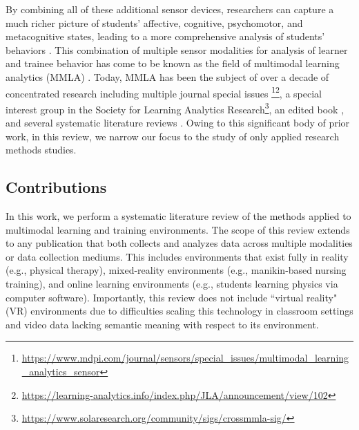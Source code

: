 \documentclass[manuscript,screen,review]{acmart}
\begin{document}
By combining all of these additional sensor devices, researchers can capture a much richer picture of students' affective, cognitive, psychomotor, and metacognitive states, leading to a more comprehensive analysis of students' behaviors \cite{blikstein2016multimodal}. This combination of multiple sensor modalities for analysis of learner and trainee behavior has come to be known as the field of multimodal learning analytics (MMLA) \cite{blikstein2013multimodal, blikstein2016multimodal, worsley_multimodal_2018}. Today, MMLA has been the subject of over a decade of concentrated research including multiple journal special issues \cite{BJETSpecialIssue}\footnote{\href{https://www.mdpi.com/journal/sensors/special_issues/multimodal_learning_analytics_sensor}{https://www.mdpi.com/journal/sensors/special\_issues/multimodal\_learning\_analytics\_sensor}}\footnote{\href{https://learning-analytics.info/index.php/JLA/announcement/view/102}{https://learning-analytics.info/index.php/JLA/announcement/view/102}}, a special interest group in the Society for Learning Analytics Research\footnote{\href{https://www.solaresearch.org/community/sigs/crossmmla-sig/}{https://www.solaresearch.org/community/sigs/crossmmla-sig/}}, an edited book \cite{MMLAHandbook}, and several systematic literature reviews \cite{Chango2022, Alwahaby2022, Shankar2018, Crescenzi2020, Mu2020, DiMitri2018, worsley_multimodal_2018}. Owing to this significant body of prior work, in this review, we narrow our focus to the study of only applied research methods studies.

\subsection{Contributions} \label{subsec:contributions}

In this work, we perform a systematic literature review of the methods applied to multimodal learning and training environments. The scope of this review extends to any publication that both collects and analyzes data across multiple modalities or data collection mediums. This includes environments that exist fully in reality (e.g., physical therapy), mixed-reality environments (e.g., manikin-based nursing training), and online learning environments (e.g., students learning physics via computer software). Importantly, this review does not include ``virtual reality" (VR) environments due to difficulties scaling this technology in classroom settings \cite{cook2019challenges} and video data lacking semantic meaning with respect to its environment.
\end{document}
